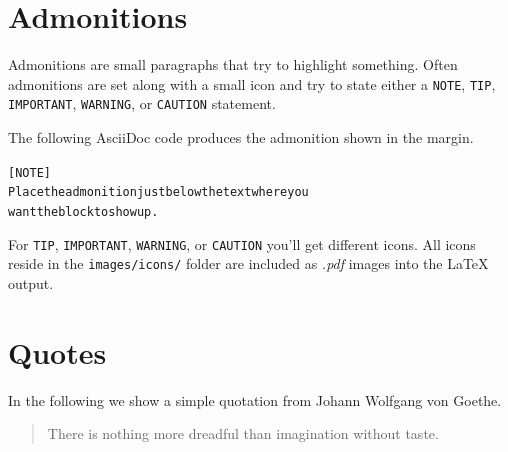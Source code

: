 \documentclass[10pt,a4paper,oneside,BCOR5mm]{scrartcl}
\begin{document}
\section{Admonitions}
\label{_admonitions}
 \par\noindent{}Admonitions are small paragraphs that try to highlight something. Often admonitions are set along with a small icon and try to state either a \texttt{NOTE},
\texttt{TIP}, \texttt{IMPORTANT}, \texttt{WARNING}, or \texttt{CAUTION} statement. \newline{}
\begin{addmargin*}[0em]{0em}
\vspace*{2mm}
\vspace*{2mm}
\end{addmargin*}
 \par\noindent{}The following AsciiDoc code produces the admonition shown in the margin.
\begin{alltt}[\textquotedbl{}NOTE\textquotedbl{}]
Place the admonition just below the text where you
want the block to show up.\end{alltt}
 \par\noindent{}For \texttt{TIP}, \texttt{IMPORTANT}, \texttt{WARNING}, or \texttt{CAUTION} you'll get different icons. All icons reside in the \texttt{images/icons/} folder are included as \emph{.pdf} images into the \LaTeX{} output.
\hypertarget{_quotes}{}
\section{Quotes}
\label{_quotes}
 \par\noindent{}In the following we show a simple quotation from Johann Wolfgang von Goethe.
\begin{quote}

 \par\noindent{}There is nothing more dreadful than imagination without taste.

\end{quote}
\end{document}

